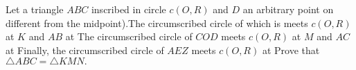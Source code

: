 Let a triangle $ABC$ inscribed in circle $c(O,R)$ and $D$ an arbitrary point on different from the midpoint).The circumscribed circle of which is  meets $c(O,R)$ at $K$ and $AB$ at The circumscribed circle of $COD$ meets $c(O,R)$ at $M$ and $AC$ at Finally, the circumscribed circle of $AEZ$ meets $c(O,R)$ at Prove that $\triangle{ABC}=\triangle{KMN}.$
